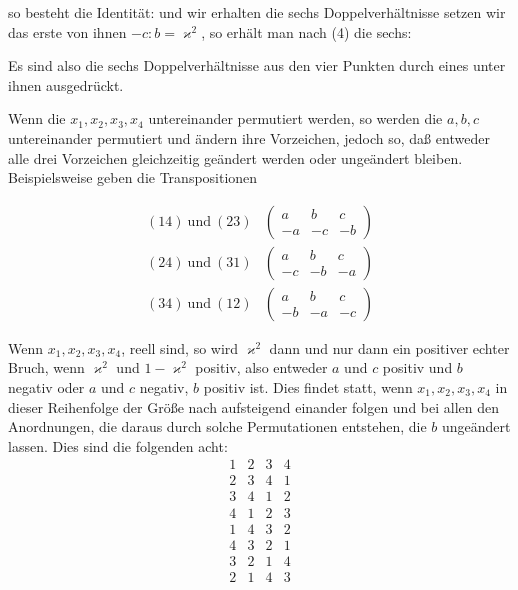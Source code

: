 so besteht die Identität:
und wir erhalten die sechs Doppelverhältnisse
setzen wir das erste von ihnen $-c:b=\varkappa^2$, so erhält man nach (4) die sechs:

Es sind also die sechs Doppelverhältnisse aus den vier Punkten  durch eines unter ihnen ausgedrückt.

Wenn die $x_1, x_2, x_3, x_4$ untereinander permutiert werden, so werden die $a, b, c$ untereinander permutiert und ändern ihre Vorzeichen, jedoch so, daß entweder alle drei Vorzeichen gleichzeitig geändert werden oder ungeändert bleiben. Beispielsweise geben die Transpositionen

\[
\begin{aligned}
(14)\ \text{und}\ (23) & \begin{pmatrix} a & b & c \\ -a & -c & -b \end{pmatrix} \\
(24)\ \text{und}\ (31) & \begin{pmatrix} a & b & c \\ -c & -b & -a \end{pmatrix} \\
(34)\ \text{und}\ (12) & \begin{pmatrix} a & b & c \\ -b & -a & -c \end{pmatrix}
\end{aligned}
\]


Wenn $x_1, x_2, x_3, x_4$, reell sind, so wird $\varkappa^2$ dann und nur dann ein positiver echter Bruch, wenn $\varkappa^2$ und $1-\varkappa^2$ positiv, also entweder $a$ und $c$ positiv und $b$ negativ oder $a$ und $c$ negativ, $b$ positiv ist. Dies findet statt, wenn $x_1, x_2, x_3, x_4$ in dieser Reihenfolge der Größe nach aufsteigend einander folgen und bei allen den Anordnungen, die daraus durch solche Permutationen entstehen, die $b$ ungeändert lassen. Dies sind die folgenden acht:
\[
\begin{array}{cccc}
1 & 2 & 3 & 4 \\
2 & 3 & 4 & 1 \\
3 & 4 & 1 & 2 \\
4 & 1 & 2 & 3 \\
1 & 4 & 3 & 2 \\
4 & 3 & 2 & 1 \\
3 & 2 & 1 & 4 \\
2 & 1 & 4 & 3
\end{array}
\]
